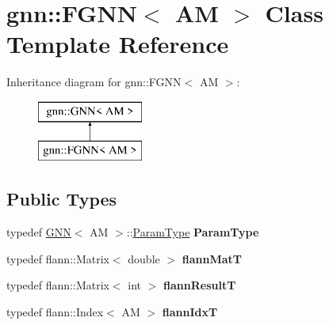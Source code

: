 \hypertarget{classgnn_1_1FGNN}{\section{gnn\-:\-:F\-G\-N\-N$<$ A\-M $>$ Class Template Reference}
\label{classgnn_1_1FGNN}
}
Inheritance diagram for gnn\-:\-:F\-G\-N\-N$<$ A\-M $>$\-:\begin{figure}[H]
\begin{center}
\leavevmode
\includegraphics[height=2.000000cm]{classgnn_1_1FGNN}
\end{center}
\end{figure}
\subsection*{Public Types}
\begin{DoxyCompactItemize}
\item 
\hypertarget{classgnn_1_1FGNN_ae5c033a15842672868be407b1a859988}{typedef \hyperlink{classgnn_1_1GNN}{G\-N\-N}$<$ A\-M $>$\-::\hyperlink{structgnn_1_1GNNParams}{Param\-Type} {\bfseries Param\-Type}}\label{classgnn_1_1FGNN_ae5c033a15842672868be407b1a859988}

\item 
\hypertarget{classgnn_1_1FGNN_ae0f5a1e5e0dd1b97a1d2bc93796cd473}{typedef flann\-::\-Matrix$<$ double $>$ {\bfseries flann\-Mat\-T}}\label{classgnn_1_1FGNN_ae0f5a1e5e0dd1b97a1d2bc93796cd473}

\item 
\hypertarget{classgnn_1_1FGNN_aaf008fffa550777666cf892b488ddc53}{typedef flann\-::\-Matrix$<$ int $>$ {\bfseries flann\-Result\-T}}\label{classgnn_1_1FGNN_aaf008fffa550777666cf892b488ddc53}

\item 
\hypertarget{classgnn_1_1FGNN_a1a6bb03c1d1518be57021ef24a92a8ae}{typedef flann\-::\-Index$<$ A\-M $>$ {\bfseries flann\-Idx\-T}}\label{classgnn_1_1FGNN_a1a6bb03c1d1518be57021ef24a92a8ae}

\end{DoxyCompactItemize}

